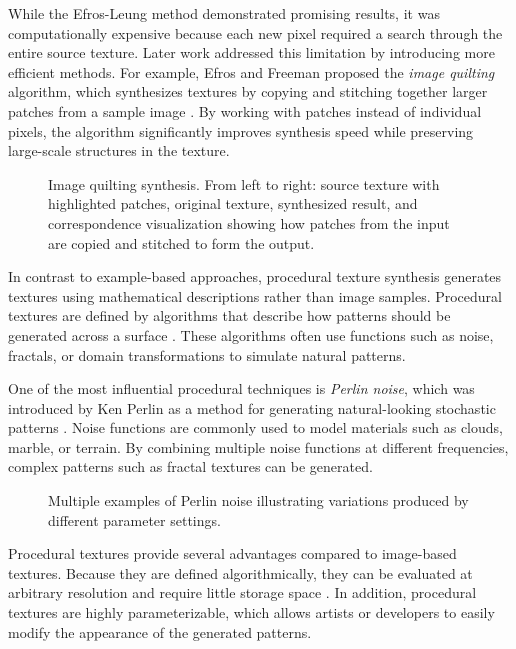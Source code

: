 While the Efros-Leung method demonstrated promising results, it was computationally expensive because each new pixel required a search through the entire source texture. Later work addressed this limitation by introducing more efficient methods. For example, Efros and Freeman proposed the \textit{image quilting} algorithm, which synthesizes textures by copying and stitching together larger patches from a sample image \cite{efros2001imagequilting}. By working with patches instead of individual pixels, the algorithm significantly improves synthesis speed while preserving large-scale structures in the texture.

\begin{figure}[H]
    \centering
    {Image quilting synthesis. From left to right: source texture with highlighted patches, original texture, synthesized result, and correspondence visualization showing how patches from the input are copied and stitched to form the output.}
    \label{fig:image-quitting-comparison}
\end{figure}

In contrast to example-based approaches, procedural texture synthesis generates textures using mathematical descriptions rather than image samples. Procedural textures are defined by algorithms that describe how patterns should be generated across a surface \cite{ebert2003texturing}. These algorithms often use functions such as noise, fractals, or domain transformations to simulate natural patterns.

One of the most influential procedural techniques is \textit{Perlin noise}, which was introduced by Ken Perlin as a method for generating natural-looking stochastic patterns \cite{ebert2003texturing}. Noise functions are commonly used to model materials such as clouds, marble, or terrain. By combining multiple noise functions at different frequencies, complex patterns such as fractal textures can be generated.

\begin{figure}[H]
    \centering
    {Multiple examples of Perlin noise illustrating variations produced by different parameter settings.}
    \label{fig:perlin-examples}
\end{figure}

Procedural textures provide several advantages compared to image-based textures. Because they are defined algorithmically, they can be evaluated at arbitrary resolution and require little storage space \cite{akenine2018realtime}. In addition, procedural textures are highly parameterizable, which allows artists or developers to easily modify the appearance of the generated patterns.

